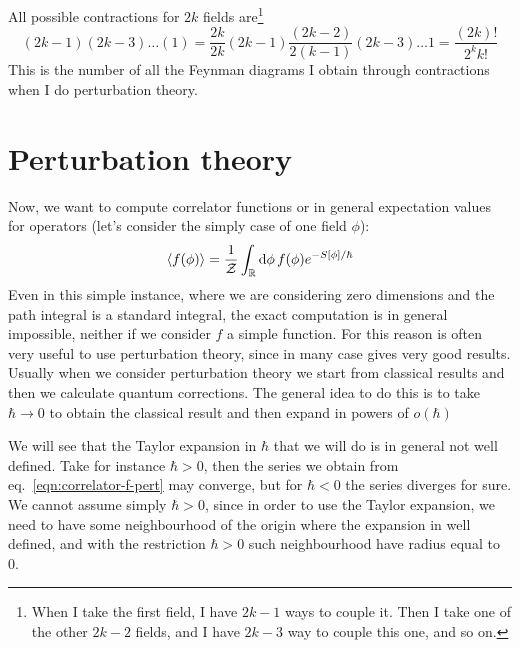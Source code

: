 \documentclass[../main/main.tex]{subfiles}
\begin{document}
All possible contractions for $2k$ fields are\footnote{When I take the first field, I have $2k-1$ ways to couple it. Then I take one of the other $2k-2$ fields, and I have $2k-3$ way to couple this one, and so on.}
\begin{equation}\label{eqn:Wick-n-possible-contr}
(2k-1)(2k-3)\dots(1)=\frac{2k}{2k}(2k-1)\frac{(2k-2)}{2(k-1)}(2k-3)\dots1=\frac{(2k)!}{2^kk!}
\end{equation}
This is the number of all the Feynman diagrams I obtain through contractions when I do perturbation theory. 


\section{Perturbation theory}

Now, we want to compute correlator functions or in general expectation values for operators (let's consider the simply case of one field $\phi$):
\begin{equation}\label{eqn:correlator-f-pert}
\langle f(\phi)\rangle=\frac1{\mathcal Z}\int_{\mathbb{R}}\textup{d}\phi\, f(\phi)e^{-S[\phi]/\hbar}
\end{equation}
Even in this simple instance, where we are considering zero dimensions and the path integral is a standard integral, the exact computation is in general impossible, neither if we consider $f$  a simple function. For this reason is often very useful to use perturbation theory, since in many case gives very good results. Usually when we consider perturbation theory we start from classical results and then we calculate quantum corrections. The general idea to do this is to take $\hbar\to0$ to obtain the classical result and then expand in powers of $o(\hbar)$

We will see that  the Taylor expansion in $\hbar$ that we will do is in general not well defined. Take for instance $\hbar>0$, then the series we obtain from eq.~\eqref{eqn:correlator-f-pert} may converge, but for $\hbar<0$ the series diverges for sure. We cannot assume simply $\hbar>0$, since in order to use the Taylor expansion, we need to have some neighbourhood of the origin where the expansion in well defined, and with the restriction $\hbar>0$ such neighbourhood have radius equal to 0.  
\end{document}
